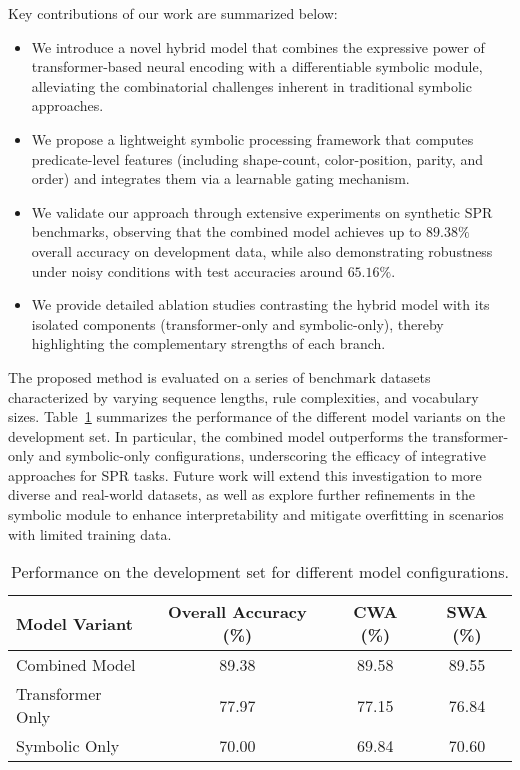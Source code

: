 \documentclass{article}
\begin{document}
Key contributions of our work are summarized below:
\begin{itemize}
    \item We introduce a novel hybrid model that combines the expressive power of transformer-based neural encoding with a differentiable symbolic module, alleviating the combinatorial challenges inherent in traditional symbolic approaches.
    \item We propose a lightweight symbolic processing framework that computes predicate-level features (including shape-count, color-position, parity, and order) and integrates them via a learnable gating mechanism.
    \item We validate our approach through extensive experiments on synthetic SPR benchmarks, observing that the combined model achieves up to \(89.38\%\) overall accuracy on development data, while also demonstrating robustness under noisy conditions with test accuracies around \(65.16\%\).
    \item We provide detailed ablation studies contrasting the hybrid model with its isolated components (transformer-only and symbolic-only), thereby highlighting the complementary strengths of each branch.
\end{itemize}

The proposed method is evaluated on a series of benchmark datasets characterized by varying sequence lengths, rule complexities, and vocabulary sizes. Table~\ref{tab:performance} summarizes the performance of the different model variants on the development set. In particular, the combined model outperforms the transformer-only and symbolic-only configurations, underscoring the efficacy of integrative approaches for SPR tasks. Future work will extend this investigation to more diverse and real-world datasets, as well as explore further refinements in the symbolic module to enhance interpretability and mitigate overfitting in scenarios with limited training data.

\begin{table}[h]
\centering
\begin{tabular}{lccc}
\hline
Model Variant & Overall Accuracy (\%) & CWA (\%) & SWA (\%) \\
\hline
Combined Model & 89.38 & 89.58 & 89.55 \\
Transformer Only & 77.97 & 77.15 & 76.84 \\
Symbolic Only & 70.00 & 69.84 & 70.60 \\
\hline
\end{tabular}
\caption{Performance on the development set for different model configurations.}
\label{tab:performance}
\end{table}
\end{document}
